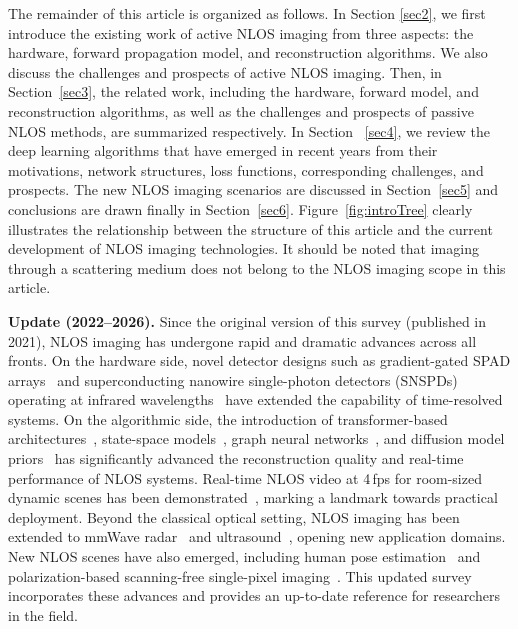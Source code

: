 The remainder of this article is organized as follows. In Section \ref{sec2}, we first introduce the existing work of active NLOS imaging from three aspects: the hardware, forward propagation model, and reconstruction algorithms. We also discuss the challenges and prospects of active NLOS imaging. Then, in Section~\ref{sec3}, the related work, including the hardware, forward model, and reconstruction algorithms, as well as the challenges and prospects of passive NLOS methods, are summarized respectively. In Section ~\ref{sec4}, we review the deep learning algorithms that have emerged in recent years from their motivations, network structures, loss functions, corresponding challenges, and prospects. The new NLOS imaging scenarios are discussed in Section~\ref{sec5} and conclusions are drawn finally in Section~\ref{sec6}.
Figure~\ref{fig:introTree} clearly illustrates the relationship between the structure of this article and the current development of NLOS imaging technologies.
It should be noted that imaging through a scattering medium\cite{lindell_three-dimensional_2020,bertolotti_non-invasive_2012} does not belong to the NLOS imaging scope in this article.

\vspace{0.8mm}
\noindent \textbf{Update (2022--2026).}
Since the original version of this survey (published in 2021), NLOS imaging has undergone rapid and dramatic advances across all fronts.
On the hardware side, novel detector designs such as gradient-gated SPAD arrays~\cite{zhaoGradientGatedSPAD2023} and superconducting nanowire single-photon detectors (SNSPDs) operating at infrared wavelengths~\cite{fengSNSPD2023} have extended the capability of time-resolved systems.
On the algorithmic side, the introduction of transformer-based architectures~\cite{liNLOST2023,liTransiT2025}, state-space models~\cite{liMambaTemporalConsistency2024}, graph neural networks~\cite{suDGNLOS2025}, and diffusion model priors~\cite{suModelGuidedDiffusion2024} has significantly advanced the reconstruction quality and real-time performance of NLOS systems. Real-time NLOS video at 4\,fps for room-sized dynamic scenes has been demonstrated~\cite{yeRealTimeNLOS2024}, marking a landmark towards practical deployment. Beyond the classical optical setting, NLOS imaging has been extended to mmWave radar~\cite{laiHoloRadar2025} and ultrasound~\cite{ultrasoundNLOS2025}, opening new application domains. New NLOS scenes have also emerged, including human pose estimation~\cite{xiaoHumanPose2026} and polarization-based scanning-free single-pixel imaging~\cite{zhouPolarizationSinglePixel2026}. This updated survey incorporates these advances and provides an up-to-date reference for researchers in the field.

